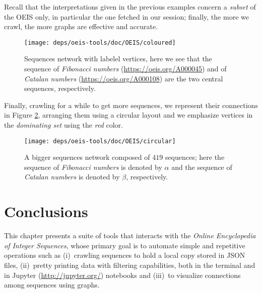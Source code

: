 \begin{remark}
Recall that the interpretations given in the previous examples concern a
\textit{subset} of the OEIS only, in particular the one fetched in our session;
finally, the more we crawl, the more graphs are effective and accurate.
\end{remark}

\begin{figure}
\begin{sideways}
\texttt{[image: deps/oeis-tools/doc/OEIS/coloured]}
\caption{Sequences network with labelel vertices, here we see that the sequence
of \textit{Fibonacci numbers} (\url{https://oeis.org/A000045}) and of
\textit{Catalan numbers} (\url{https://oeis.org/A000108}) are the two central
sequences, respectively.}
\end{sideways}
\label{fig:oeis:sequences:network:fibonacci:catalan:labeled}
\end{figure}

\begin{example}
Finally, crawling for a while to get more sequences, we represent their
connections in Figure
\ref{fig:oeis:sequences:network:fibonacci:catalan:circular}, arranging them
using a circular layout and we emphasize vertices in the \textit{dominating
set} using the \textit{red} color.
\end{example}

\begin{figure}
\hspace{-3cm}
\texttt{[image: deps/oeis-tools/doc/OEIS/circular]}
\caption{A bigger sequences network composed of $419$ sequences; here the
sequence of \textit{Fibonacci numbers} is denoted by $\alpha$ and the sequence
of \textit{Catalan numbers} is denoted by $\beta$, respectively.}
\label{fig:oeis:sequences:network:fibonacci:catalan:circular}
\end{figure}

\section*{Conclusions}

This chapter presents a suite of tools that interacts with the \textit{Online
Encyclopedia of Integer Sequences}, whose primary goal is to automate simple
and repetitive operations such as (i)~crawling sequences to hold a local copy
stored in JSON files, (ii)~pretty printing data with filtering capabilities,
both in the terminal and in Jupyter (\url{http://jupyter.org/}) notebooks and
(iii)~to visualize connections among sequences using graphs.

